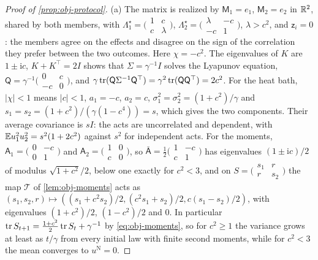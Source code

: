 \begin{proof}[Proof of \cref{prop:obj-protocol}]
(a) The matrix is realized by $\mathsf M_1=e_1$, $\mathsf M_2=e_2$ in $\mathbb{R}^2$, shared by both members, with $\Lambda^\star_1=\bigl(\begin{smallmatrix}1&c\\c&\lambda\end{smallmatrix}\bigr)$, $\Lambda^\star_2=\bigl(\begin{smallmatrix}\lambda&-c\\-c&1\end{smallmatrix}\bigr)$, $\lambda>c^2$, and $\mathsf z_i=0$: the members agree on the effects and disagree on the sign of the correlation they prefer between the two outcomes. Here $\chi=-c^2$. The eigenvalues of $K$ are $1\pm\mathrm ic$, $K+K^\top=2I$ shows that $\Sigma=\gamma^{-1}I$ solves the Lyapunov equation, $\mathsf Q=\gamma^{-1}\bigl(\begin{smallmatrix}0&c\\-c&0\end{smallmatrix}\bigr)$, and $\gamma\operatorname{tr}(\mathsf Q\Sigma^{-1}\mathsf Q^\top)=\gamma^2\operatorname{tr}(\mathsf Q\mathsf Q^\top)=2c^2$. For the heat bath, $\lvert\chi\rvert<1$ means $\lvert c\rvert<1$, $a_1=-c$, $a_2=c$, $\sigma_1^2=\sigma_2^2=(1+c^2)/\gamma$ and $s_1=s_2=(1+c^2)/(\gamma(1-c^4))=s$, which gives the two components. Their average covariance is $sI$: the acts are uncorrelated and dependent, with $\mathbb{E} u_1^2u_2^2=s^2(1+2c^2)$ against $s^2$ for independent acts. For the moments, $\mathsf A_1=\bigl(\begin{smallmatrix}0&-c\\0&1\end{smallmatrix}\bigr)$ and $\mathsf A_2=\bigl(\begin{smallmatrix}1&0\\c&0\end{smallmatrix}\bigr)$, so $\bar{\mathsf A}=\frac12\bigl(\begin{smallmatrix}1&-c\\c&1\end{smallmatrix}\bigr)$ has eigenvalues $(1\pm\mathrm ic)/2$ of modulus $\sqrt{1+c^2}/2$, below one exactly for $c^2<3$, and on $S=\bigl(\begin{smallmatrix}s_1&r\\r&s_2\end{smallmatrix}\bigr)$ the map $\mathcal T$ of \cref{lem:obj-moments} acts as $(s_1,s_2,r)\mapsto((s_1+c^2s_2)/2,(c^2s_1+s_2)/2,c(s_1-s_2)/2)$, with eigenvalues $(1+c^2)/2$, $(1-c^2)/2$ and $0$. In particular $\operatorname{tr} S_{t+1}=\frac{1+c^2}2\operatorname{tr} S_t+\gamma^{-1}$ by \eqref{eq:obj-moments}, so for $c^2\ge1$ the variance grows at least as $t/\gamma$ from every initial law with finite second moments, while for $c^2<3$ the mean converges to $u^{\mathrm N}=0$.


\end{proof}
